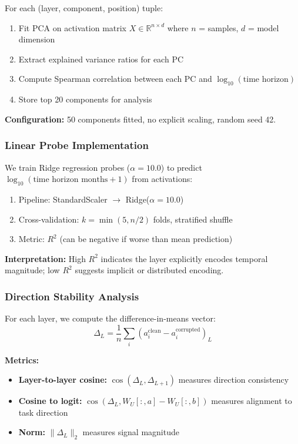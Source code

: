 \documentclass{article}
\begin{document}
For each (layer, component, position) tuple:
\begin{enumerate}
    \item Fit PCA on activation matrix $X \in \mathbb{R}^{n \times d}$ where $n$ = samples, $d$ = model dimension
    \item Extract explained variance ratios for each PC
    \item Compute Spearman correlation between each PC and $\log_{10}(\text{time horizon})$
    \item Store top 20 components for analysis
\end{enumerate}

\textbf{Configuration:} 50 components fitted, no explicit scaling, random seed 42.

\subsubsection{Linear Probe Implementation}

We train Ridge regression probes ($\alpha = 10.0$) to predict $\log_{10}(\text{time horizon months} + 1)$ from activations:

\begin{enumerate}
    \item Pipeline: StandardScaler $\rightarrow$ Ridge($\alpha=10.0$)
    \item Cross-validation: $k = \min(5, n/2)$ folds, stratified shuffle
    \item Metric: $R^2$ (can be negative if worse than mean prediction)
\end{enumerate}

\textbf{Interpretation:} High $R^2$ indicates the layer explicitly encodes temporal magnitude; low $R^2$ suggests implicit or distributed encoding.

\subsubsection{Direction Stability Analysis}

For each layer, we compute the difference-in-means vector:
\begin{equation}
\Delta_L = \frac{1}{n}\sum_i (a_i^{\text{clean}} - a_i^{\text{corrupted}})_L
\end{equation}

\textbf{Metrics:}
\begin{itemize}
    \item \textbf{Layer-to-layer cosine:} $\cos(\Delta_L, \Delta_{L+1})$ measures direction consistency
    \item \textbf{Cosine to logit:} $\cos(\Delta_L, W_U[:, a] - W_U[:, b])$ measures alignment to task direction
    \item \textbf{Norm:} $\|\Delta_L\|_2$ measures signal magnitude
\end{itemize}
\end{document}
